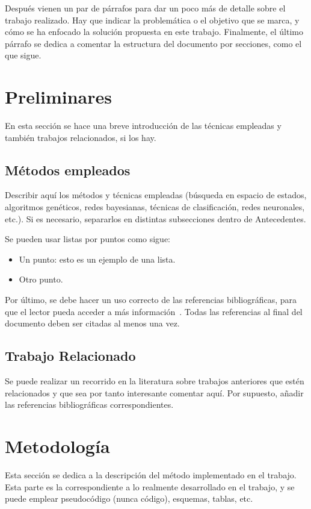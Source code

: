 \documentclass[conference,a4paper]{IEEEtran}
\begin{document}
Después vienen un par de párrafos para dar un poco más de detalle sobre el
trabajo realizado. Hay que indicar la problemática o el objetivo que se marca,
y cómo se ha enfocado la solución propuesta en este trabajo. Finalmente, el
último párrafo se dedica a comentar la estructura del documento por secciones,
como el que sigue.


\section{Preliminares}

En esta sección se hace una breve introducción de las técnicas empleadas y
también trabajos relacionados, si los hay.


\subsection{Métodos empleados}

Describir aquí los métodos y técnicas empleadas (búsqueda en espacio de
estados, algoritmos genéticos, redes bayesianas, técnicas de clasificación,
redes neuronales, etc.). Si es necesario, separarlos en distintas subsecciones
dentro de Antecedentes.

Se pueden usar listas por puntos como sigue:
\begin{itemize}
\item Un punto: esto es un ejemplo de una lista.
\item Otro punto.
\end{itemize}

Por último, se debe hacer un uso correcto de las referencias bibliográficas,
para que el lector pueda acceder a más información~\cite{b2}. Todas las
referencias al final del documento deben ser citadas al menos una vez.


\subsection{Trabajo Relacionado}

Se puede realizar un recorrido en la literatura sobre trabajos anteriores que
estén relacionados y que sea por tanto interesante comentar aquí. Por supuesto,
añadir las referencias bibliográficas correspondientes.


\section{Metodología}

Esta sección se dedica a la descripción del método implementado en el trabajo.
Esta parte es la correspondiente a lo realmente desarrollado en el trabajo, y
se puede emplear pseudocódigo (nunca código), esquemas, tablas, etc.
\end{document}
